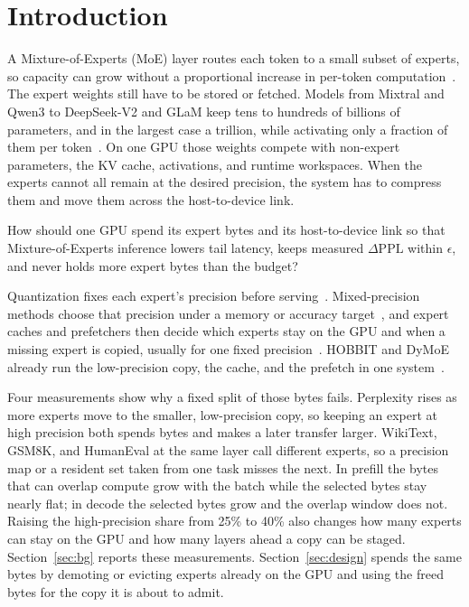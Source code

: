 \section{Introduction}
\label{sec:intro}

A Mixture-of-Experts (MoE) layer routes each token to a small subset of experts, so capacity can grow without a proportional increase in per-token computation~\cite{shazeer2017outrageously,fedus2022switch,lepikhin2021gshard}.
The expert weights still have to be stored or fetched.
Models from Mixtral and Qwen3 to DeepSeek-V2 and GLaM keep tens to hundreds of billions of parameters, and in the largest case a trillion, while activating only a fraction of them per token~\cite{jiang2024mixtral,qwen3technicalreport,deepseekv2,du2022glam}.
On one GPU those weights compete with non-expert parameters, the KV cache, activations, and runtime workspaces.
When the experts cannot all remain at the desired precision, the system has to compress them and move them across the host-to-device link.

How should one GPU spend its expert bytes and its host-to-device link so that Mixture-of-Experts inference lowers tail latency, keeps measured \(\Delta\mathrm{PPL}\) within \(\epsilon\), and never holds more expert bytes than the budget?

Quantization fixes each expert's precision before serving~\cite{frantar2022gptq,lin2024awq}.
Mixed-precision methods choose that precision under a memory or accuracy target~\cite{duanmu2025mxmoe}, and expert caches and prefetchers then decide which experts stay on the GPU and when a missing expert is copied, usually for one fixed precision~\cite{eliseev2023fast,song2024promoe,xue2024moe}.
HOBBIT and DyMoE already run the low-precision copy, the cache, and the prefetch in one system~\cite{tang2024hobbit,huang2026dymoe}.

Four measurements show why a fixed split of those bytes fails.
Perplexity rises as more experts move to the smaller, low-precision copy, so keeping an expert at high precision both spends bytes and makes a later transfer larger.
WikiText, GSM8K, and HumanEval at the same layer call different experts, so a precision map or a resident set taken from one task misses the next.
In prefill the bytes that can overlap compute grow with the batch while the selected bytes stay nearly flat; in decode the selected bytes grow and the overlap window does not.
Raising the high-precision share from 25\% to 40\% also changes how many experts can stay on the GPU and how many layers ahead a copy can be staged.
Section~\ref{sec:bg} reports these measurements.
Section~\ref{sec:design} spends the same bytes by demoting or evicting experts already on the GPU and using the freed bytes for the copy it is about to admit.


